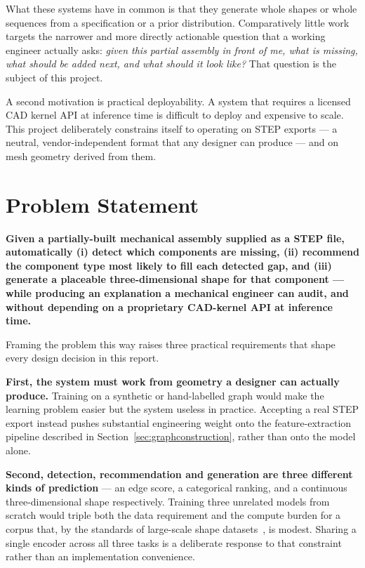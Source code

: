 \documentclass[12pt,oneside,a4paper]{report}
\begin{document}
What these systems have in common is that they generate whole shapes or whole
sequences from a specification or a prior distribution. Comparatively little
work targets the narrower and more directly actionable question that a
working engineer actually asks: \emph{given this partial assembly in front of
me, what is missing, what should be added next, and what should it look
like?} That question is the subject of this project.

A second motivation is practical deployability. A system that requires a
licensed CAD kernel API at inference time is difficult to deploy and
expensive to scale. This project deliberately constrains itself to operating
on STEP exports --- a neutral, vendor-independent format that any designer
can produce --- and on mesh geometry derived from them.

\section{Problem Statement}

\textbf{Given a partially-built mechanical assembly supplied as a STEP file,
automatically (i) detect which components are missing, (ii) recommend the
component type most likely to fill each detected gap, and (iii) generate a
placeable three-dimensional shape for that component --- while producing an
explanation a mechanical engineer can audit, and without depending on a
proprietary CAD-kernel API at inference time.}

Framing the problem this way raises three practical requirements that shape
every design decision in this report.

\textbf{First, the system must work from geometry a designer can actually
produce.} Training on a synthetic or hand-labelled graph would make the
learning problem easier but the system useless in practice. Accepting a real
STEP export instead pushes substantial engineering weight onto the
feature-extraction pipeline described in Section~\ref{sec:graphconstruction},
rather than onto the model alone.

\textbf{Second, detection, recommendation and generation are three different
kinds of prediction} --- an edge score, a categorical ranking, and a
continuous three-dimensional shape respectively. Training three unrelated
models from scratch would triple both the data requirement and the compute
burden for a corpus that, by the standards of large-scale shape
datasets~\cite{koch2019abc,mo2019partnet}, is modest. Sharing a single
encoder across all three tasks is a deliberate response to that constraint
rather than an implementation convenience.
\end{document}
